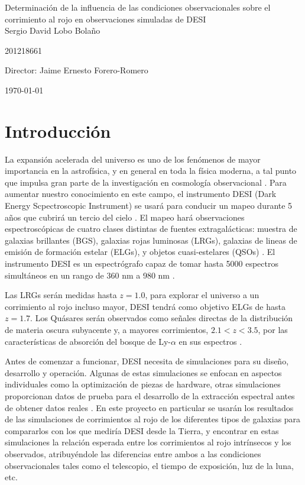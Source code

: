 \documentclass[12pt]{article}
\begin{document}
\begin{center}
\huge

Determinación de la influencia de las condiciones observacionales sobre el corrimiento al rojo en observaciones simuladas de DESI\\
\vspace{3mm}
\Large Sergio David Lobo Bolaño

\large
201218661

\vspace{2mm}
\Large
Director: Jaime Ernesto Forero-Romero


\vspace{2mm}

\today
\end{center}


\section{Introducción}

La expansión acelerada del universo es uno de los fenómenos de mayor
importancia en la astrofísica, y en general en toda la física moderna,
a tal punto que impulsa gran parte de la investigación en cosmología
observacional \cite{Nord:2016plv}. Para aumentar nuestro conocimiento
en este campo, el instrumento DESI (Dark Energy Scpectroscopic
Instrument) se usará para conducir un mapeo durante 5 años que cubrirá
un tercio del cielo \cite{Aghamousa:2016zmz}. El mapeo hará observaciones
espectroscópicas de cuatro clases distintas de fuentes
extragalácticas:   muestra de galaxias brillantes (BGS), galaxias rojas luminosas (LRGs), galaxias de lineas de emisión de formación estelar (ELGs), y objetos cuasi-estelares (QSOs) \cite{Aghamousa:2016zmz}. El instrumento DESI es un espectrógrafo capaz de tomar hasta 5000 espectros simultáneos en un rango de 360 nm a 980 nm \cite{Aghamousa:2016sne}. 

Las LRGs serán medidas hasta $z = 1.0$, para explorar el universo a un corrimiento al rojo incluso mayor, DESI tendrá como objetivo ELGs de hasta $z = 1.7$. Los Quásares serán observados como señales directas de la distribución de materia oscura subyacente y, a mayores corrimientos, $2.1<z<3.5$, por las características de absorción del bosque de Ly-$\alpha$ en sus espectros \cite{Aghamousa:2016zmz}. 

Antes de comenzar a funcionar, DESI necesita de simulaciones para su
diseño, desarrollo y operación. Algunas de estas simulaciones se
enfocan en aspectos individuales como la optimización de piezas de
hardware, otras simulaciones proporcionan datos de prueba para el
desarrollo de la extracción espectral antes de obtener datos reales
\cite{Aghamousa:2016sne}. En este proyecto en particular se usarán los
resultados de las simulaciones de corrimientos al rojo de los
diferentes tipos de galaxias para compararlos con los que mediría DESI
desde la Tierra, y encontrar en estas simulaciones la relación
esperada entre los corrimientos al rojo intr\'insecos y los observados,
atribuyéndole las diferencias entre ambos a las condiciones
observacionales tales como el telescopio, el tiempo de exposición, luz
de la luna, etc.   
\end{document}
